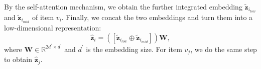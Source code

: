 \documentclass[letterpaper]{article} %
\newcommand{\suhang}[1]{\textcolor{blue}{SW: #1}}
\begin{document}
By the self-attention mechanism, we obtain the further integrated embedding $\mathbf{\widetilde{z}}_{i_{low}}$ and $\mathbf{\widetilde{z}}_{i_{mid}}$ of item $v_i$. Finally, we concat the two embeddings and turn them into a low-dimensional representation:
\begin{equation}
   \mathbf{\hat{z}}_i=([\mathbf{\widetilde{z}}_{i_{low}} \oplus \mathbf{\widetilde{z}}_{i_{mid}}])\mathbf{W},
   \label{eq:final_eq}
\end{equation}
where $\mathbf{W} \in \mathbb{R}^{2d^{\prime}\times d^{\prime}}$ and $d^{\prime}$ is the embedding size. For item $v_j$, we do the same step to obtain $\mathbf{\hat{z}}_j$.
\end{document}
